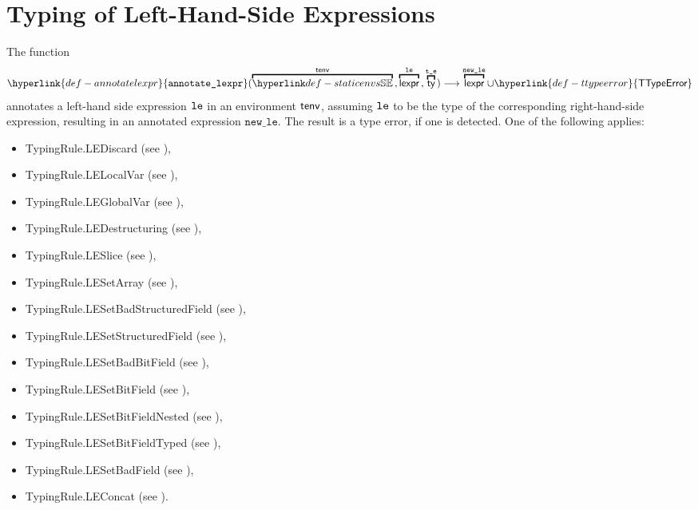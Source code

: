 \documentclass{book}
\newcommand\TTypeError[0]{\hyperlink{def-ttypeerror}{\textsf{TTypeError}}}
\newcommand\annotatelexpr[1]{\hyperlink{def-annotatelexpr}{\texttt{annotate\_lexpr}}(#1)}
\newcommand\vte[0]{\texttt{t\_e}}
\newcommand\newle[0]{\texttt{new\_le}}
\begin{document}
\chapter{Typing of Left-Hand-Side Expressions}
\hypertarget{def-annotatelexpr}{}
The function
\[
  \annotatelexpr{
    \overname{\staticenvs}{\tenv} \aslsep
    \overname{\lexpr}{\vle} \aslsep
    \overname{\ty}{\vte}} \aslto
    \overname{\lexpr}{\newle} \cup \TTypeError
\]
annotates a left-hand side expression $\texttt{le}$ in an environment $\textsf{tenv}$, assuming $\texttt{le}$
to be the type of the corresponding right-hand-side expression,
resulting in an annotated expression $\newle$.
The result is a type error, if one is detected.
One of the following applies:
\begin{itemize}
\item TypingRule.LEDiscard (see ),
\item TypingRule.LELocalVar (see ),
\item TypingRule.LEGlobalVar (see ),
\item TypingRule.LEDestructuring (see ),
\item TypingRule.LESlice (see ),
\item TypingRule.LESetArray (see ),
\item TypingRule.LESetBadStructuredField (see ),
\item TypingRule.LESetStructuredField (see ),
\item TypingRule.LESetBadBitField (see ),
\item TypingRule.LESetBitField (see ),
\item TypingRule.LESetBitFieldNested (see ),
\item TypingRule.LESetBitFieldTyped (see ),
\item TypingRule.LESetBadField (see ),
\item TypingRule.LEConcat (see ).
\end{itemize}
\end{document}
